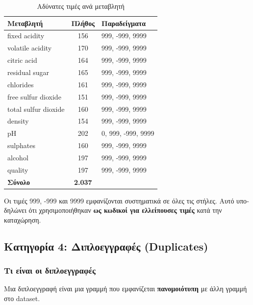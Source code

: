 \documentclass[12pt,a4paper]{article}
\begin{document}
\begin{table}[H]
\centering
\caption{\textgreek{Αδύνατες τιμές ανά μεταβλητή}}
\label{tab:impossible}
\begin{tabular}{@{}lcp{5cm}@{}}
\toprule
\textbf{\textgreek{Μεταβλητή}} & \textbf{\textgreek{Πλήθος}} & \textbf{\textgreek{Παραδείγματα}} \\
\midrule
fixed acidity & 156 & 999, -999, 9999 \\
volatile acidity & 170 & 999, -999, 9999 \\
citric acid & 164 & 999, -999, 9999 \\
residual sugar & 165 & 999, -999, 9999 \\
chlorides & 161 & 999, -999, 9999 \\
free sulfur dioxide & 151 & 999, -999, 9999 \\
total sulfur dioxide & 160 & 999, -999, 9999 \\
density & 154 & 999, -999, 9999 \\
pH & 202 & 0, 999, -999, 9999 \\
sulphates & 160 & 999, -999, 9999 \\
alcohol & 197 & 999, -999, 9999 \\
quality & 197 & 999, -999, 9999 \\
\midrule
\textbf{\textgreek{Σύνολο}} & \textbf{2.037} & \\
\bottomrule
\end{tabular}
\end{table}

\begin{warningbox}
\textgreek{Οι τιμές 999, -999 και 9999 εμφανίζονται συστηματικά σε όλες τις στήλες. Αυτό υποδηλώνει ότι χρησιμοποιήθηκαν} \textbf{\textgreek{ως κωδικοί για ελλείπουσες τιμές}} \textgreek{κατά την καταχώρηση.}
\end{warningbox}

\subsection{\textgreek{Κατηγορία 4: Διπλοεγγραφές (Duplicates)}}

\subsubsection{\textgreek{Τι είναι οι διπλοεγγραφές}}

\textgreek{Μια διπλοεγγραφή είναι μια γραμμή που εμφανίζεται} \textbf{\textgreek{πανομοιότυπη}} \textgreek{με άλλη γραμμή στο dataset.}
\end{document}
